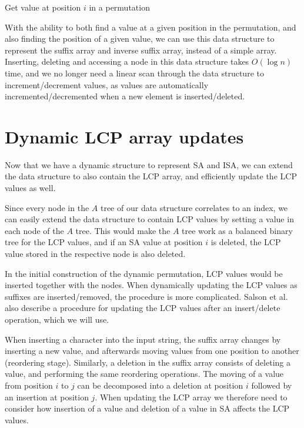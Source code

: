 \begin{algorithm}[t]
  \SetAlgoLined\DontPrintSemicolon

  \vspace{0.5cm}
  \caption{Get value at position $i$ in a permutation}
  \label{alg:dynamicpermutationaccess}
\end{algorithm}

With the ability to both find a value at a given position in the permutation, and also
finding the position of a given value, we can use this data structure to represent the
suffix array and inverse suffix array, instead of a simple array. Inserting, deleting and
accessing a node in this data structure takes $O(\log n)$ time, and we no longer need a
linear scan through the data structure to increment/decrement values, as values are
automatically incremented/decremented when a new element is inserted/deleted.

\section{Dynamic LCP array updates}

Now that we have a dynamic structure to represent SA and ISA, we can extend the data
structure to also contain the LCP array, and efficiently update the LCP values as well.

Since every node in the $A$ tree of our data structure correlates to an index, we can
easily extend the data structure to contain LCP values by setting a value in each node of
the $A$ tree. This would make the $A$ tree work as a balanced binary tree for the LCP
values, and if an SA value at position $i$ is deleted, the LCP value stored in
the respective node is also deleted.

In the initial construction of the dynamic permutation, LCP values would be inserted
together with the nodes. When dynamically updating the LCP values as suffixes are
inserted/removed, the procedure is more complicated. Salson et
al.\cite{DynamicExtendedSuffixArrays} also describe a procedure for updating the LCP
values after an insert/delete operation, which we will use.

When inserting a character into the input string, the suffix array changes by inserting a
new value, and afterwards moving values from one position to another (reordering stage).
Similarly, a deletion in the suffix array consists of deleting a value, and performing the
same reordering operations. The moving of a value from position $i$ to $j$ can be
decomposed into a deletion at position $i$ followed by an insertion at position $j$. When
updating the LCP array we therefore need to consider how insertion of a value and deletion
of a value in SA affects the LCP values.

